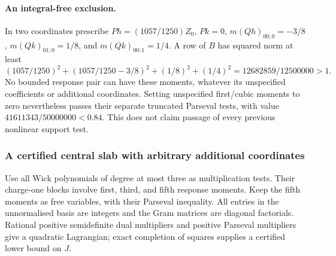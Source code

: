 \paragraph{An integral-free exclusion.}
In two coordinates prescribe $Ph=(1057/1250)Z_0$, $Pk=0$,
$m(Qh)_{00;0}=-3/8$, $m(Qk)_{01;0}=1/8$, and $m(Qk)_{00;1}=1/4$.
A row of $B$ has squared norm at least
\[
 (1057/1250)^2+(1057/1250-3/8)^2+(1/8)^2+(1/4)^2
 =12682859/12500000>1.
\]
No bounded response pair can have these moments, whatever its unspecified
coefficients or additional coordinates. Setting unspecified first/cubic
moments to zero nevertheless passes their separate truncated Parseval
tests, with value $41611343/50000000<0.84$. This does not claim passage
of every previous nonlinear support test.

\subsubsection{A certified central slab with arbitrary additional coordinates}
Use all Wick polynomials of degree at most three as multiplication tests.
Their charge-one blocks involve first, third, and fifth response moments.
Keep the fifth moments as free variables, with their Parseval inequality.
All entries in the unnormalised basis are integers and the Gram matrices
are diagonal factorials. Rational positive semidefinite dual multipliers
and positive Parseval multipliers give a quadratic Lagrangian; exact
completion of squares supplies a certified lower bound on $J$.

